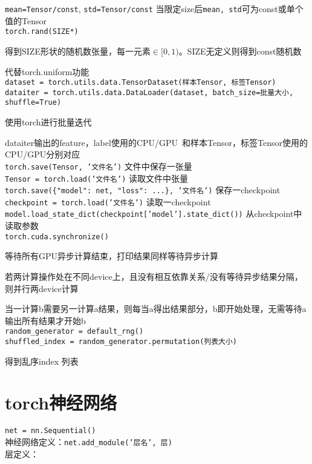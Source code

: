 \documentclass[UTF8]{ctexart}
\begin{document}
  \texttt{mean=Tensor/const}, \texttt{std=Tensor/const} 当限定size后\texttt{mean, std}可为const或单个值的Tensor\\
\texttt{torch.rand(SIZE*)}

  得到SIZE形状的随机数张量，每一元素$\in [0,1)$。SIZE无定义则得到const随机数

  代替torch.uniform功能\\
\texttt{dataset = torch.utils.data.TensorDataset(样本Tensor, 标签Tensor)}\\
\texttt{dataiter = torch.utils.data.DataLoader(dataset, batch\_size=批量大小, shuffle=True)}

  使用torch进行批量迭代
  
  dataiter输出的feature，label使用的CPU/GPU\ 和样本Tensor，标签Tensor使用的CPU/GPU分别对应\\
\texttt{torch.save(Tensor, '文件名')} 文件中保存一张量\\
\texttt{Tensor = torch.load('文件名')} 读取文件中张量\\
\texttt{torch.save(\{"model": net, "loss": ...\}, '文件名')} 保存一checkpoint\\
\texttt{checkpoint = torch.load('文件名')} 读取一checkpoint\\
\texttt{model.load\_state\_dict(checkpoint['model'].state\_dict())} 从checkpoint中读取参数\\
\texttt{torch.cuda.synchronize()} 

  等待所有GPU异步计算结束，打印结果同样等待异步计算
  
  若两计算操作处在不同device上，且没有相互依靠关系/没有等待异步结果分隔，则并行两device计算
  
  当一计算b需要另一计算a结果，则每当a得出结果部分，b即开始处理，无需等待a输出所有结果才开始b\\
\texttt{random\_generator = default\_rng()}\\
\texttt{shuffled\_index = random\_generator.permutation(列表大小)}

  得到乱序index 列表

\section{torch神经网络}
\noindent \texttt{net = nn.Sequential()}\\
神经网络定义：\texttt{net.add\_module('层名', 层)}\\
层定义：
\end{document}
